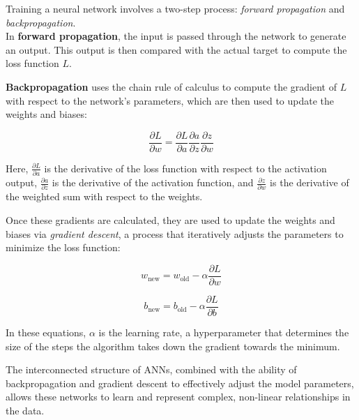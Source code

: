 Training a neural network involves a two-step process: \textit{forward propagation} and \textit{backpropagation}. \\

In \textbf{forward propagation}, the input is passed through the network to generate an output. This output is then compared with the actual target to compute the loss function $ L $.

\textbf{Backpropagation} uses the chain rule of calculus to compute the gradient of $ L $ with respect to the network's parameters, which are then used to update the weights and biases:

\[
\frac{\partial L}{\partial w} = \frac{\partial L}{\partial a} \frac{\partial a}{\partial z} \frac{\partial z}{\partial w}
\]

Here, $ \frac{\partial L}{\partial a} $ is the derivative of the loss function with respect to the activation output, $ \frac{\partial a}{\partial z} $ is the derivative of the activation function, and $ \frac{\partial z}{\partial w} $ is the derivative of the weighted sum with respect to the weights.

Once these gradients are calculated, they are used to update the weights and biases via \textit{gradient descent}, a process that iteratively adjusts the parameters to minimize the loss function:

\[
w_{\text{new}} = w_{\text{old}} - \alpha \frac{\partial L}{\partial w}
\]

\[
b_{\text{new}} = b_{\text{old}} - \alpha \frac{\partial L}{\partial b}
\]

In these equations, $ \alpha $ is the learning rate, a hyperparameter that determines the size of the steps the algorithm takes down the gradient towards the minimum.

The interconnected structure of ANNs, combined with the ability of backpropagation and gradient descent to effectively adjust the model parameters, allows these networks to learn and represent complex, non-linear relationships in the data.
